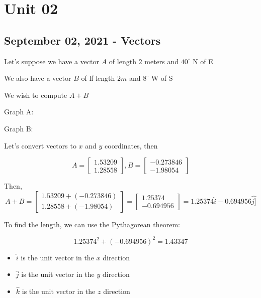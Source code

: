 \documentclass[../main.tex]{subfiles}
\begin{document}
\section{Unit 02}

\subsection{September 02, 2021 - Vectors}

\begin{remark}
Let's suppose we have a vector $A$ of length $2$ meters and $40^{\circ}$ N of E

We also have a vector $B$ of lf length $2m$ and $8^\circ$ W of S

We wish to compute $A + B$

Graph A:


Graph B:


Let's convert vectors to $x$ and $y$ coordinates, then

$$A = \begin{bmatrix}1.53209\\1.28558\end{bmatrix},
  B = \begin{bmatrix}-0.273846\\-1.98054\end{bmatrix}$$

Then, $$A + B = \begin{bmatrix}1.53209+(-0.273846)\\1.28558+(-1.98054)\end{bmatrix}
              = \begin{bmatrix}1.25374\\-0.694956\end{bmatrix}
              = 1.25374\hat{i} - 0.694956\hat{j]}$$

To find the length, we can use the Pythagorean theorem:

$$1.25374^2 + (-0.694956)^2 = 1.43347$$

\end{remark}

\begin{definition}
  \begin{itemize}
    \item $\hat{i}$ is the unit vector in the $x$ direction
    \item $\hat{j}$ is the unit vector in the $y$ direction
    \item $\hat{k}$ is the unit vector in the $z$ direction
  \end{itemize}
\end{definition}
\end{document}
